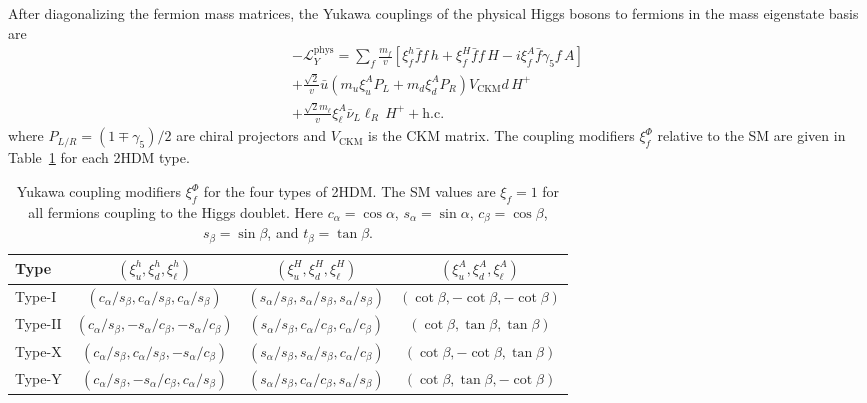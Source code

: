 After diagonalizing the fermion mass matrices, the Yukawa couplings of the physical Higgs bosons to fermions in the mass eigenstate basis are~\cite{Branco:2011iw}
\begin{gather}
-\mathcal{L}_Y^{\text{phys}} = \sum_f \frac{m_f}{v} \left[\xi_f^h \bar{f} f \, h + \xi_f^H \bar{f} f \, H - i \xi_f^A \bar{f} \gamma_5 f \, A\right] \nonumber\\
+ \frac{\sqrt{2}}{v} \bar{u} \left(m_u \xi_u^A P_L + m_d \xi_d^A P_R\right) V_{\text{CKM}} d \, H^+ \nonumber\\
+ \frac{\sqrt{2} m_\ell}{v} \xi_\ell^A \bar{\nu}_L \ell_R \, H^+ + \text{h.c.}
\label{eq:yukawa_physical}
\end{gather}
where $P_{L/R} = (1 \mp \gamma_5)/2$ are chiral projectors and $V_{\text{CKM}}$ is the CKM matrix. The coupling modifiers $\xi_f^{\Phi}$ relative to the SM are given in Table~\ref{tab:yukawa_couplings} for each 2HDM type.

\begin{table}[htbp]
\centering
\caption{Yukawa coupling modifiers $\xi_f^{\Phi}$ for the four types of 2HDM. The SM values are $\xi_f = 1$ for all fermions coupling to the Higgs doublet. Here $c_\alpha = \cos\alpha$, $s_\alpha = \sin\alpha$, $c_\beta = \cos\beta$, $s_\beta = \sin\beta$, and $t_\beta = \tan\beta$.}
\label{tab:yukawa_couplings}
\small
\setlength{\tabcolsep}{3pt}
\begin{tabular}{lccc}
\hline\hline
Type & $(\xi_u^h, \xi_d^h, \xi_\ell^h)$ & $(\xi_u^H, \xi_d^H, \xi_\ell^H)$ & $(\xi_u^A, \xi_d^A, \xi_\ell^A)$ \\
\hline
Type-I & $(c_\alpha/s_\beta, c_\alpha/s_\beta, c_\alpha/s_\beta)$ & $(s_\alpha/s_\beta, s_\alpha/s_\beta, s_\alpha/s_\beta)$ & $(\cot\beta, -\cot\beta, -\cot\beta)$ \\
Type-II & $(c_\alpha/s_\beta, -s_\alpha/c_\beta, -s_\alpha/c_\beta)$ & $(s_\alpha/s_\beta, c_\alpha/c_\beta, c_\alpha/c_\beta)$ & $(\cot\beta, \tan\beta, \tan\beta)$ \\
Type-X & $(c_\alpha/s_\beta, c_\alpha/s_\beta, -s_\alpha/c_\beta)$ & $(s_\alpha/s_\beta, s_\alpha/s_\beta, c_\alpha/c_\beta)$ & $(\cot\beta, -\cot\beta, \tan\beta)$ \\
Type-Y & $(c_\alpha/s_\beta, -s_\alpha/c_\beta, c_\alpha/s_\beta)$ & $(s_\alpha/s_\beta, c_\alpha/c_\beta, s_\alpha/s_\beta)$ & $(\cot\beta, \tan\beta, -\cot\beta)$ \\
\hline\hline
\end{tabular}
\end{table}

